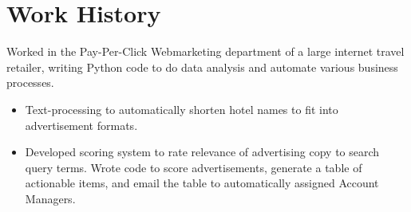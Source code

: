 \documentclass[11pt,a4paper,sans]{moderncv} %
\begin{document}




\section{Work History}


{Worked in the Pay-Per-Click Webmarketing department of a large internet travel retailer, writing Python code to do data analysis and automate various business processes.
	\begin{itemize}
		\item Text-processing to automatically shorten hotel names to fit into advertisement formats.
		\item Developed scoring system to rate relevance of advertising copy to search query terms.  Wrote code to score advertisements, generate a table of actionable items, and email the table to automatically assigned Account Managers.
	\end{itemize}
}
\vspace{0.2em}
\end{document}

